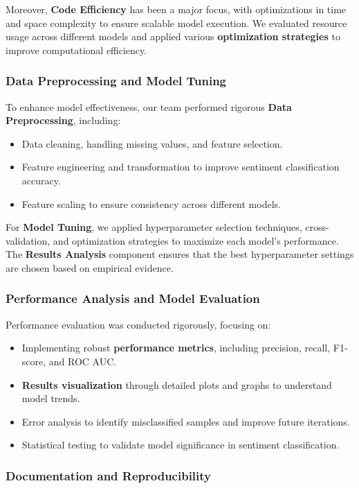 Moreover, \textbf{Code Efficiency} has been a major focus, with optimizations in time and space complexity to ensure scalable model execution. We evaluated resource usage across different models and applied various \textbf{optimization strategies} to improve computational efficiency.

\subsubsection{Data Preprocessing and Model Tuning}

To enhance model effectiveness, our team performed rigorous \textbf{Data Preprocessing}, including:
\begin{itemize}
    \item Data cleaning, handling missing values, and feature selection.
    \item Feature engineering and transformation to improve sentiment classification accuracy.
    \item Feature scaling to ensure consistency across different models.
\end{itemize}

For \textbf{Model Tuning}, we applied hyperparameter selection techniques, cross-validation, and optimization strategies to maximize each model’s performance. The \textbf{Results Analysis} component ensures that the best hyperparameter settings are chosen based on empirical evidence.

\subsubsection{Performance Analysis and Model Evaluation}

Performance evaluation was conducted rigorously, focusing on:
\begin{itemize}
    \item Implementing robust \textbf{performance metrics}, including precision, recall, F1-score, and ROC AUC.
    \item \textbf{Results visualization} through detailed plots and graphs to understand model trends.
    \item Error analysis to identify misclassified samples and improve future iterations.
    \item Statistical testing to validate model significance in sentiment classification.
\end{itemize}

\subsubsection{Documentation and Reproducibility}

